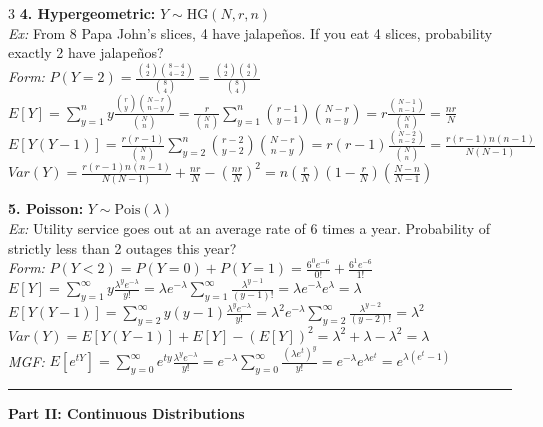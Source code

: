 \documentclass[10pt]{article}
\begin{document}
\begin{multicols*}{3}
\textbf{4. Hypergeometric:} $Y \sim \text{HG}(N, r, n)$\\
\textit{Ex:} From 8 Papa John's slices, 4 have jalapeños. If you eat 4 slices, probability exactly 2 have jalapeños?\\
\textit{Form:} $P(Y=2) = \frac{\binom{4}{2}\binom{8-4}{4-2}}{\binom{8}{4}} = \frac{\binom{4}{2}\binom{4}{2}}{\binom{8}{4}}$\\
$E[Y] = \sum_{y=1}^{n} y \frac{\binom{r}{y}\binom{N-r}{n-y}}{\binom{N}{n}} = \frac{r}{\binom{N}{n}} \sum_{y=1}^{n} \binom{r-1}{y-1} \binom{N-r}{n-y} = r \frac{\binom{N-1}{n-1}}{\binom{N}{n}} = \frac{nr}{N}$\\
$E[Y(Y-1)] = \frac{r(r-1)}{\binom{N}{n}} \sum_{y=2}^{n} \binom{r-2}{y-2} \binom{N-r}{n-y} = r(r-1) \frac{\binom{N-2}{n-2}}{\binom{N}{n}} = \frac{r(r-1)n(n-1)}{N(N-1)}$\\
$Var(Y) = \frac{r(r-1)n(n-1)}{N(N-1)} + \frac{nr}{N} - (\frac{nr}{N})^2 = n(\frac{r}{N})(1-\frac{r}{N})(\frac{N-n}{N-1})$

\vspace{2mm}

\textbf{5. Poisson:} $Y \sim \text{Pois}(\lambda)$\\
\textit{Ex:} Utility service goes out at an average rate of 6 times a year. Probability of strictly less than 2 outages this year?\\
\textit{Form:} $P(Y < 2) = P(Y=0) + P(Y=1) = \frac{6^0 e^{-6}}{0!} + \frac{6^1 e^{-6}}{1!}$\\
$E[Y] = \sum_{y=1}^{\infty} y \frac{\lambda^y e^{-\lambda}}{y!} = \lambda e^{-\lambda} \sum_{y=1}^{\infty} \frac{\lambda^{y-1}}{(y-1)!} = \lambda e^{-\lambda} e^\lambda = \lambda$\\
$E[Y(Y-1)] = \sum_{y=2}^{\infty} y(y-1) \frac{\lambda^y e^{-\lambda}}{y!} = \lambda^2 e^{-\lambda} \sum_{y=2}^{\infty} \frac{\lambda^{y-2}}{(y-2)!} = \lambda^2$\\
$Var(Y) = E[Y(Y-1)] + E[Y] - (E[Y])^2 = \lambda^2 + \lambda - \lambda^2 = \lambda$\\
\textit{MGF:} $E[e^{tY}] = \sum_{y=0}^{\infty} e^{ty} \frac{\lambda^y e^{-\lambda}}{y!} = e^{-\lambda} \sum_{y=0}^{\infty} \frac{(\lambda e^t)^y}{y!} = e^{-\lambda} e^{\lambda e^t} = e^{\lambda(e^t - 1)}$

\vspace{2mm}
\hrule
\vspace{2mm}

\begin{center}
\textbf{Part II: Continuous Distributions}
\end{center}


\end{multicols*}
\end{document}
